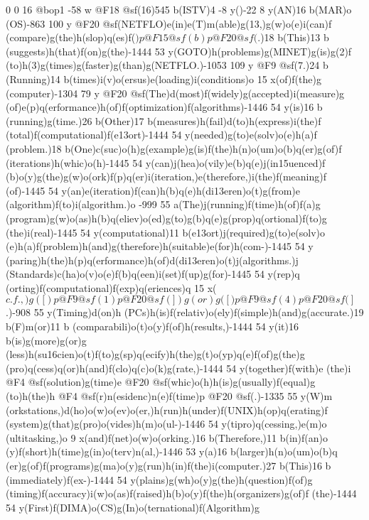 {{{{{{{{{{{{{{{{{{{{{{{{{{{{{{{{{{{{{{{{{{{{{{{{{{{{{{{{{{{{{{{{{{{{{{{{{{{{{{{{{{{{{{{{{{{{{{{{{{{0 0 16 @bop1 -58 w @F18 @sf(16)545 b(ISTV)4 -8 y()-22 8 y(AN)16 b(MAR)o
(OS)-863 100 y @F20 @sf(NETFLO)e(in)e(T)m(able)g(13,)g(w)o(e)i(can)f
(compare)g(the)h(slop)q(es)f(\()p @F15 @sf(b)p @F20 @sf(\).)18 b(This)13 b
(suggests)h(that)f(on)g(the)-1444 53 y(GOTO)h(problems)g(MINET)g(is)g(2)f
(to)h(3)g(times)g(faster)g(than)g(NETFLO.)-1053 109 y @F9 @sf(7.)24 b
(Running)14 b(times)i(v)o(ersus)e(loading)i(conditions)o 15 x(of)f(the)g
(computer)-1304 79 y @F20 @sf(The)d(most)f(widely)g(accepted)i(measure)g
(of)e(p)q(erformance)h(of)f(optimization)f(algorithms)-1446 54 y(is)16 b
(running)g(time.)26 b(Other)17 b(measures)h(fail)d(to)h(express)i(the)f
(total)f(computational)f(e\013ort)-1444 54 y(needed)g(to)e(solv)o(e)h(a)f
(problem.)18 b(One)c(suc)o(h)g(example)g(is)f(the)h(n)o(um)o(b)q(er)g(of)f
(iterations)h(whic)o(h)-1445 54 y(can)j(hea)o(vily)e(b)q(e)j(in\015uenced)f
(b)o(y)g(the)g(w)o(ork)f(p)q(er)i(iteration,)e(therefore,)i(the)f(meaning)f
(of)-1445 54 y(an)e(iteration)f(can)h(b)q(e)h(di\013eren)o(t)g(from)e
(algorithm)f(to)i(algorithm.)o -999 55 a(The)j(running)f(time)h(of)f(a)g
(program)g(w)o(as)h(b)q(eliev)o(ed)g(to)g(b)q(e)g(prop)q(ortional)f(to)g
(the)i(real)-1445 54 y(computational)11 b(e\013ort)j(required)g(to)e(solv)o
(e)h(a)f(problem)h(and)g(therefore)h(suitable)e(for)h(com-)-1445 54 y
(paring)h(the)h(p)q(erformance)h(of)d(di\013eren)o(t)j(algorithms.)j
(Standards)c(ha)o(v)o(e)f(b)q(een)i(set)f(up)g(for)-1445 54 y(rep)q
(orting)f(computational)f(exp)q(eriences)q 15 x(\(c.f.,)g([)p @F9 @sf(1)p 
@F20 @sf(])g(or)g([)p @F9 @sf(4)p @F20 @sf(]\).)-908 55 y(Timing)d(on)h
(PCs)h(is)f(relativ)o(ely)f(simple)h(and)g(accurate.)19 b(F)m(or)11 b
(comparabili)o(t)o(y)f(of)h(results,)-1444 54 y(it)16 b(is)g(more)g(or)g
(less)h(su\016cien)o(t)f(to)g(sp)q(ecify)h(the)g(t)o(yp)q(e)f(of)g(the)g
(pro)q(cess)q(or)h(and)f(clo)q(c)o(k)g(rate,)-1444 54 y(together)f(with)e
(the)i @F4 @sf(solution)g(time)e @F20 @sf(whic)o(h)h(is)g(usually)f(equal)g
(to)h(the)h @F4 @sf(r)n(esidenc)n(e)f(time)p @F20 @sf(.)-1335 55 y(W)m
(orkstations,)d(ho)o(w)o(ev)o(er,)h(run)h(under)f(UNIX)h(op)q(erating)f
(system)g(that)g(pro)o(vides)h(m)o(ul-)-1446 54 y(tipro)q(cessing,)e(m)o
(ultitasking,)o 9 x(and)f(net)o(w)o(orking.)16 b(Therefore,)11 b(in)f(an)o
(y)f(short)h(time)g(in)o(terv)n(al,)-1446 53 y(a)16 b(larger)h(n)o(um)o(b)q
(er)g(of)f(programs)g(ma)o(y)g(run)h(in)f(the)i(computer.)27 b(This)16 b
(immediately)f(ex-)-1444 54 y(plains)g(wh)o(y)g(the)h(question)f(of)g
(timing)f(accuracy)i(w)o(as)f(raised)h(b)o(y)f(the)h(organizers)g(of)f
(the)-1444 54 y(First)f(DIMA)o(CS)g(In)o(ternational)f(Algorithm)g
}}}}}}}}}}}}}}}}}}}}}}}}}}}}}}}}}}}}}}}}}}}}}}}}}}}}}}}}}}}}}}}}}}}}}}}}}}}}}}}}}}}}}}}}}}}}}}}}}}}
